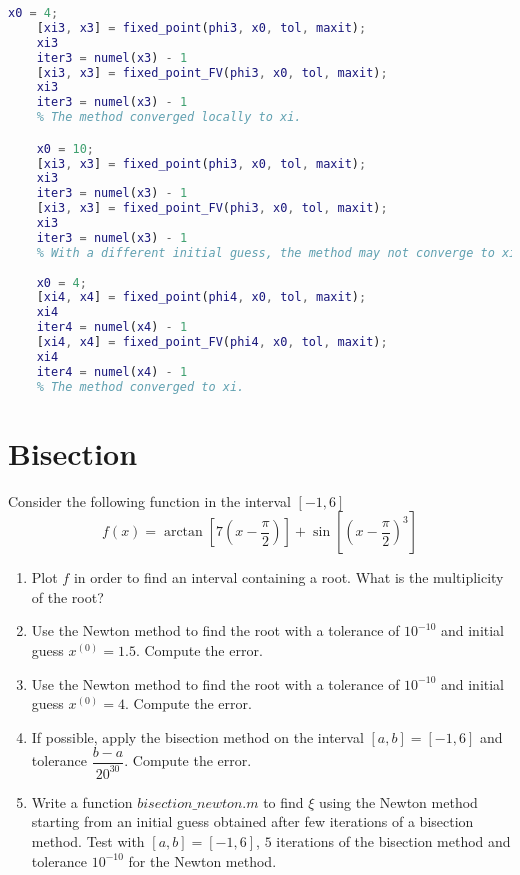 \documentclass[12pt, a4paper]{report}
\begin{document}
\begin{lstlisting}[language=Matlab]
    x0 = 4;
    [xi3, x3] = fixed_point(phi3, x0, tol, maxit);
    xi3
    iter3 = numel(x3) - 1
    [xi3, x3] = fixed_point_FV(phi3, x0, tol, maxit);
    xi3
    iter3 = numel(x3) - 1
    % The method converged locally to xi.

    x0 = 10;
    [xi3, x3] = fixed_point(phi3, x0, tol, maxit);
    xi3
    iter3 = numel(x3) - 1
    [xi3, x3] = fixed_point_FV(phi3, x0, tol, maxit);
    xi3
    iter3 = numel(x3) - 1
    % With a different initial guess, the method may not converge to xi.
    
    x0 = 4;
    [xi4, x4] = fixed_point(phi4, x0, tol, maxit);
    xi4
    iter4 = numel(x4) - 1
    [xi4, x4] = fixed_point_FV(phi4, x0, tol, maxit);
    xi4
    iter4 = numel(x4) - 1
    % The method converged to xi.
        \end{lstlisting}  

    \newpage 

    \section{Bisection}
        Consider the following function in the interval $[-1, 6]$
        \[f (x) = \arctan\left[7\left(x-\dfrac{\pi}{2}\right)\right]+\sin\left[\left(x-\dfrac{\pi}{2}\right)^{3}\right]\]
        \begin{enumerate}
            \item Plot $f$ in order to find an interval containing a root. What is the multiplicity of the root?
            \item Use the Newton method to find the root with a tolerance of $10^{-10}$ and initial guess $x^{(0)}=1.5$. Compute the error.
            \item Use the Newton method to find the root with a tolerance of $10^{-10}$ and initial guess $x^{(0)}=4$. Compute the error.
            \item If possible, apply the bisection method on the interval $[a, b] = [-1, 6]$ and tolerance $\dfrac{b-a}{20^{30}}$. Compute the error.
            \item Write a function $bisection\_newton.m$ to find $\xi$ using the Newton method starting from an initial guess obtained after few iterations of a bisection method. 
                Test with $[a, b] = [-1, 6]$, $5$ iterations of the bisection method and tolerance $10^{-10}$ for the Newton method.
        \end{enumerate}
\end{document}
